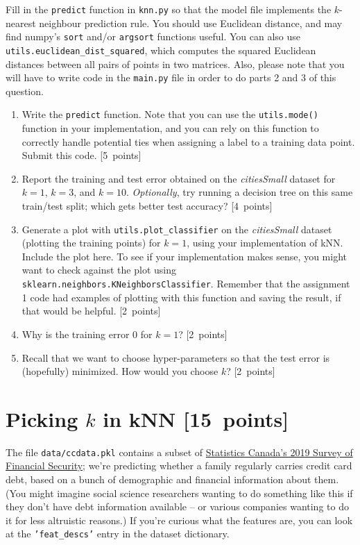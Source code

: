 \documentclass{article}
\newcommand{\blu}[1]{{\textcolor{blu}{#1}}}
\let\ask\blu
\newcommand\pts[1]{\textcolor{pointscolour}{[#1~points]}}
\begin{document}
    Fill in the \texttt{predict} function in \texttt{knn.py} so that the model file implements the $k$-nearest neighbour prediction rule.
    You should use Euclidean distance, and may find numpy's \texttt{sort} and/or \texttt{argsort} functions useful.
    You can also use \texttt{utils.euclidean\string_dist\string_squared}, which computes the squared Euclidean distances between all pairs of points in two matrices. Also, please note that you will have to write code in the \texttt{main.py} file in order to do parts 2 and 3 of this question.
    \begin{enumerate}
        \item Write the \texttt{predict} function. Note that you can use the \texttt{utils.mode()} function in your implementation, and you can rely on this function to correctly handle potential ties when assigning a label to a training data point. \ask{Submit this code.} \pts{5}
        
        \item \ask{Report the training and test error} obtained on the \emph{citiesSmall} dataset for $k=1$, $k=3$, and $k=10$. \emph{Optionally}, try running a decision tree on this same train/test split; which gets better test accuracy? \pts{4}
        
        \item Generate a plot with \texttt{utils.plot\_classifier} on the \emph{citiesSmall} dataset (plotting the training points) for $k=1$, using your implementation of kNN. \ask{Include the plot here.} To see if your implementation makes sense, you might want to check against the plot using \texttt{sklearn.neighbors.KNeighborsClassifier}. Remember that the assignment 1 code had examples of plotting with this function and saving the result, if that would be helpful. \pts{2}
        
        \item Why is the training error $0$ for $k=1$? \pts{2}
        
        \item Recall that we want to choose hyper-parameters so that the test error is (hopefully) minimized. How would you choose $k$? \pts{2}
        
    \end{enumerate}

    \clearpage
    \section{Picking $k$ in kNN \pts{15}}
    The file \texttt{data/ccdata.pkl} contains a subset of \href{https://www23.statcan.gc.ca/imdb/p2SV.pl?Function=getSurvey&SDDS=2620}{Statistics Canada's 2019 Survey of Financial Security}; we're predicting whether a family regularly carries credit card debt, based on a bunch of demographic and financial information about them. (You might imagine social science researchers wanting to do something like this if they don't have debt information available -- or various companies wanting to do it for less altruistic reasons.) If you're curious what the features are, you can look at the \texttt{'feat\_descs'} entry in the dataset dictionary.
\end{document}
